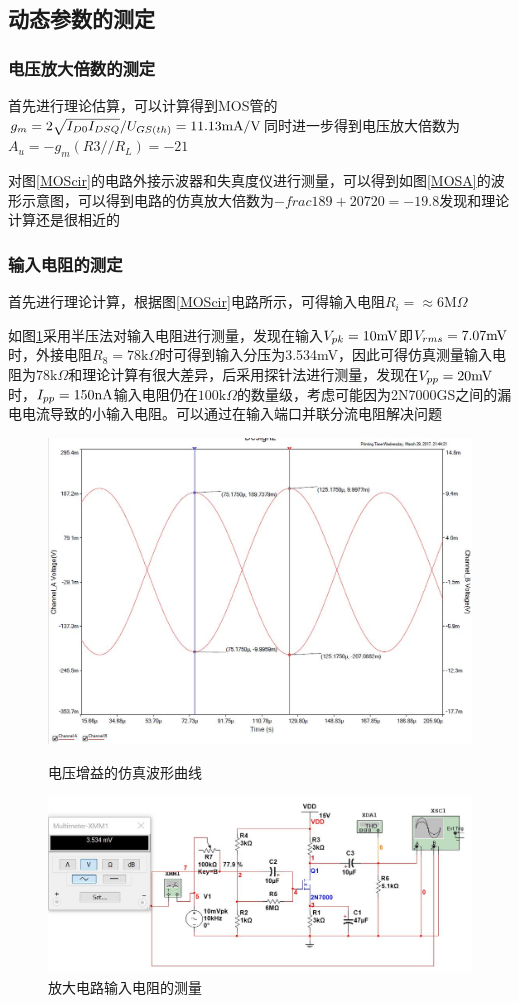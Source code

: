\documentclass[UTF8,a4paper]{ctexart}
\begin{document}
\subsection{动态参数的测定}
\subsubsection{电压放大倍数的测定}
首先进行理论估算，可以计算得到MOS管的$g_m=2\sqrt{I_{D0}I_{DSQ}}/U_{GS(th)}=11.13\rm{mA/V}$同时进一步得到电压放大倍数为$A_u=-g_m(R3//R_L)=-21$

对图\ref{MOScir}的电路外接示波器和失真度仪进行测量，可以得到如图\ref{MOSA}的波形示意图，可以得到电路的仿真放大倍数为$-frac{189+207}{20}=-19.8$发现和理论计算还是很相近的
\subsubsection{输入电阻的测定}
首先进行理论计算，根据图\ref{MOScir}电路所示，可得输入电阻$R_i=\approx6\mathrm{M}\Omega$

如图\ref{MOSri}采用半压法对输入电阻进行测量，发现在输入$V_{pk}=10\rm{mV}$即$V_{rms}=7.07\rm{mV}$时，外接电阻$R_8=78\mathrm{k}\Omega$时可得到输入分压为3.534mV，因此可得仿真测量输入电阻为$78\mathrm{k}\Omega$和理论计算有很大差异，后采用探针法进行测量，发现在$V_{pp}=20\rm{mV}$时，$I_{pp}=150\rm{nA}$输入电阻仍在$100\mathrm{k}\Omega$的数量级，考虑可能因为2N7000GS之间的漏电电流导致的小输入电阻。可以通过在输入端口并联分流电阻解决问题
\begin{figure}
\centering
\includegraphics[width=\textwidth]{2-3AA.jpg}
\caption{电压增益的仿真波形曲线}
\label{MOSA}
\includegraphics[width=\textwidth]{2-4Ri.jpg}
\caption{放大电路输入电阻的测量}
\label{MOSri}
\end{figure}
\end{document}

